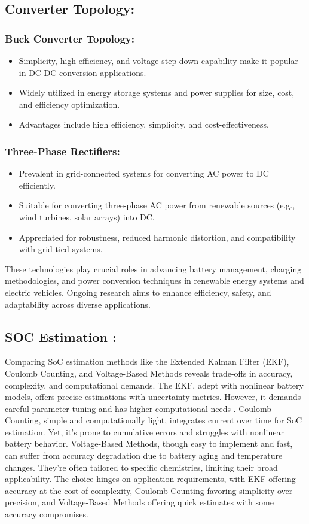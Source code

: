 \documentclass[conference]{IEEEtran}
\begin{document}
\subsection{Converter Topology: }
\subsubsection{Buck Converter Topology:}
\begin{itemize}
  \item Simplicity, high efficiency, and voltage step-down capability make it popular in DC-DC conversion applications.
  \item Widely utilized in energy storage systems and power supplies for size, cost, and efficiency optimization.
  \item Advantages include high efficiency, simplicity, and cost-effectiveness.
\end{itemize}

\subsubsection{Three-Phase Rectifiers:}
\begin{itemize}
  \item Prevalent in grid-connected systems for converting AC power to DC efficiently.
  \item Suitable for converting three-phase AC power from renewable sources (e.g., wind turbines, solar arrays) into DC.
  \item Appreciated for robustness, reduced harmonic distortion, and compatibility with grid-tied systems.
\end{itemize}

These technologies play crucial roles in advancing battery management, charging methodologies, and power conversion techniques in renewable energy systems and electric vehicles. Ongoing research aims to enhance efficiency, safety, and adaptability across diverse applications.

\subsection{SOC Estimation :}
\hspace{0.5cm}Comparing SoC estimation methods like the Extended Kalman Filter (EKF), Coulomb Counting, and Voltage-Based Methods reveals trade-offs in accuracy, complexity, and computational demands.
The EKF, adept with nonlinear battery models, offers precise estimations with uncertainty metrics. However, it demands careful parameter tuning and has higher computational needs \cite{Ucuncu2019} \cite{Jiang2013}.
Coulomb Counting, simple and computationally light, integrates current over time for SoC estimation. Yet, it's prone to cumulative errors and struggles with nonlinear battery behavior.
Voltage-Based Methods, though easy to implement and fast, can suffer from accuracy degradation due to battery aging and temperature changes. They're often tailored to specific chemistries, limiting their broad applicability.
The choice hinges on application requirements, with EKF offering accuracy at the cost of complexity, Coulomb Counting favoring simplicity over precision, and Voltage-Based Methods offering quick estimates with some accuracy compromises.
\end{document}
